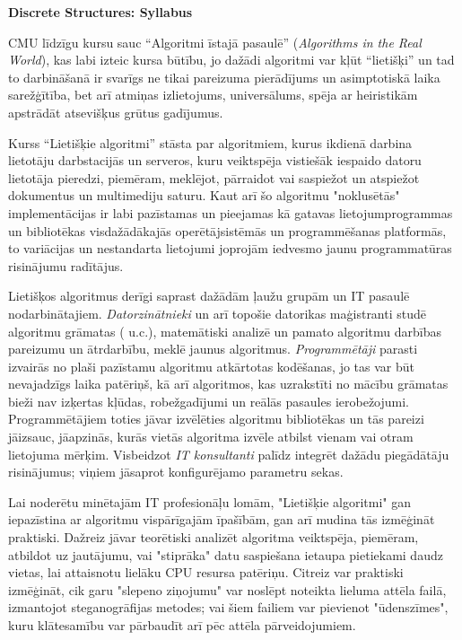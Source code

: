 \documentclass[11pt]{article}
\begin{document}
\thispagestyle{empty}

{\Large \bf Discrete Structures: Syllabus}

CMU līdzīgu kursu sauc ``Algoritmi īstajā 
pasaulē'' ({\em Algorithms in the Real World}), kas labi izteic kursa
būtību, jo dažādi algoritmi var kļūt ``lietišķi'' un tad to darbināšanā
ir svarīgs ne tikai pareizuma pierādījums un asimptotiskā laika sarežģītība, 
bet arī atmiņas izlietojums, universālums, spēja ar heiristikām apstrādāt
atsevišķus grūtus gadījumus.

Kurss ``Lietišķie algoritmi'' stāsta par algoritmiem, kurus ikdienā darbina 
lietotāju darbstacijās un serveros, kuru veiktspēja vistiešāk iespaido datoru 
lietotāja pieredzi, piemēram, meklējot, pārraidot vai saspiežot un atspiežot 
dokumentus un multimediju saturu. Kaut arī šo algoritmu "noklusētās" implementācijas
ir labi pazīstamas un pieejamas kā gatavas lietojumprogrammas un bibliotēkas
visdažādākajās operētājsistēmās un programmēšanas platformās, to variācijas 
un nestandarta lietojumi
joprojām iedvesmo jaunu programmatūras risinājumu radītājus. 

Lietišķos algoritmus derīgi saprast dažādām ļaužu grupām un IT pasaulē nodarbinātajiem. 
{\em Datorzinātnieki} un arī topošie datorikas maģistranti studē algoritmu grāmatas
(\cite{CLR} u.c.), matemātiski analizē un pamato algoritmu darbības pareizumu un ātrdarbību, 
meklē jaunus algoritmus. {\em Programmētāji} parasti izvairās no plaši pazīstamu algoritmu 
atkārtotas kodēšanas, jo tas var būt nevajadzīgs laika patēriņš, kā arī algoritmos, kas uzrakstīti
no mācību grāmatas bieži nav izķertas kļūdas, robežgadījumi un reālās pasaules ierobežojumi. 
Programmētājiem toties jāvar izvēlēties algoritmu bibliotēkas un tās pareizi jāizsauc, 
jāapzinās, kurās vietās algoritma izvēle atbilst vienam vai otram lietojuma mērķim.
Visbeidzot {\em IT konsultanti} palīdz integrēt dažādu piegādātāju risinājumus; viņiem 
jāsaprot konfigurējamo parametru sekas. 

Lai noderētu minētajām IT profesionāļu lomām, "Lietišķie algoritmi" gan iepazīstina ar algoritmu 
vispārīgajām īpašībām, gan arī mudina tās izmēģināt praktiski. Dažreiz jāvar teorētiski analizēt
algoritma veiktspēja, piemēram, atbildot uz jautājumu, vai "stiprāka" datu saspiešana 
ietaupa pietiekami daudz vietas, lai attaisnotu lielāku CPU resursa patēriņu. 
Citreiz var praktiski izmēģināt, cik garu "slepeno ziņojumu" var noslēpt noteikta lieluma 
attēla failā, izmantojot steganogrāfijas metodes; vai šiem failiem var pievienot
"ūdenszīmes", kuru klātesamību var pārbaudīt arī pēc attēla pārveidojumiem.
\end{document}
